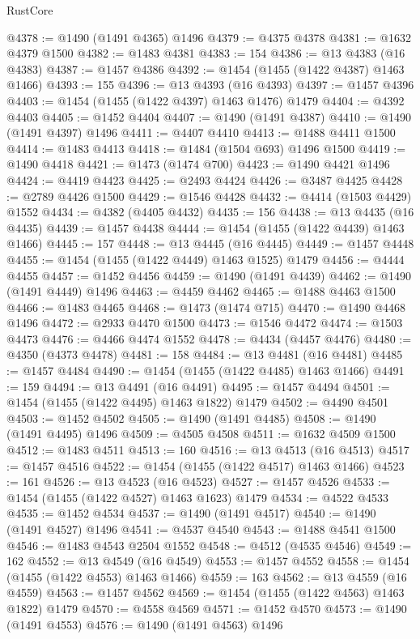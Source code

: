 \begin{lexlean}{RustCore}
\begin{coremodule}
@4378 := @1490 (@1491 @4365) @1496
@4379 := @4375 @4378
@4381 := @1632 @4379 @1500
@4382 := @1483 @4381
@4383 := 154
@4386 := @13 @4383 (@16 @4383)
@4387 := @1457 @4386
@4392 := @1454 (@1455 (@1422 @4387) @1463 @1466)
@4393 := 155
@4396 := @13 @4393 (@16 @4393)
@4397 := @1457 @4396
@4403 := @1454 (@1455 (@1422 @4397) @1463 @1476) @1479
@4404 := @4392 @4403
@4405 := @1452 @4404
@4407 := @1490 (@1491 @4387)
@4410 := @1490 (@1491 @4397) @1496
@4411 := @4407 @4410
@4413 := @1488 @4411 @1500
@4414 := @1483 @4413
@4418 := @1484 (@1504 @693) @1496 @1500
@4419 := @1490 @4418
@4421 := @1473 (@1474 @700)
@4423 := @1490 @4421 @1496
@4424 := @4419 @4423
@4425 := @2493 @4424
@4426 := @3487 @4425
@4428 := @2789 @4426 @1500
@4429 := @1546 @4428
@4432 := @4414 (@1503 @4429) @1552
@4434 := @4382 (@4405 @4432)
@4435 := 156
@4438 := @13 @4435 (@16 @4435)
@4439 := @1457 @4438
@4444 := @1454 (@1455 (@1422 @4439) @1463 @1466)
@4445 := 157
@4448 := @13 @4445 (@16 @4445)
@4449 := @1457 @4448
@4455 := @1454 (@1455 (@1422 @4449) @1463 @1525) @1479
@4456 := @4444 @4455
@4457 := @1452 @4456
@4459 := @1490 (@1491 @4439)
@4462 := @1490 (@1491 @4449) @1496
@4463 := @4459 @4462
@4465 := @1488 @4463 @1500
@4466 := @1483 @4465
@4468 := @1473 (@1474 @715)
@4470 := @1490 @4468 @1496
@4472 := @2933 @4470 @1500
@4473 := @1546 @4472
@4474 := @1503 @4473
@4476 := @4466 @4474 @1552
@4478 := @4434 (@4457 @4476)
@4480 := @4350 (@4373 @4478)
@4481 := 158
@4484 := @13 @4481 (@16 @4481)
@4485 := @1457 @4484
@4490 := @1454 (@1455 (@1422 @4485) @1463 @1466)
@4491 := 159
@4494 := @13 @4491 (@16 @4491)
@4495 := @1457 @4494
@4501 := @1454 (@1455 (@1422 @4495) @1463 @1822) @1479
@4502 := @4490 @4501
@4503 := @1452 @4502
@4505 := @1490 (@1491 @4485)
@4508 := @1490 (@1491 @4495) @1496
@4509 := @4505 @4508
@4511 := @1632 @4509 @1500
@4512 := @1483 @4511
@4513 := 160
@4516 := @13 @4513 (@16 @4513)
@4517 := @1457 @4516
@4522 := @1454 (@1455 (@1422 @4517) @1463 @1466)
@4523 := 161
@4526 := @13 @4523 (@16 @4523)
@4527 := @1457 @4526
@4533 := @1454 (@1455 (@1422 @4527) @1463 @1623) @1479
@4534 := @4522 @4533
@4535 := @1452 @4534
@4537 := @1490 (@1491 @4517)
@4540 := @1490 (@1491 @4527) @1496
@4541 := @4537 @4540
@4543 := @1488 @4541 @1500
@4546 := @1483 @4543 @2504 @1552
@4548 := @4512 (@4535 @4546)
@4549 := 162
@4552 := @13 @4549 (@16 @4549)
@4553 := @1457 @4552
@4558 := @1454 (@1455 (@1422 @4553) @1463 @1466)
@4559 := 163
@4562 := @13 @4559 (@16 @4559)
@4563 := @1457 @4562
@4569 := @1454 (@1455 (@1422 @4563) @1463 @1822) @1479
@4570 := @4558 @4569
@4571 := @1452 @4570
@4573 := @1490 (@1491 @4553)
@4576 := @1490 (@1491 @4563) @1496

\end{coremodule}
\end{lexlean}
